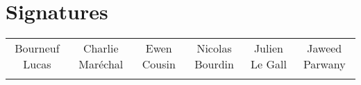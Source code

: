 
\newcommand{\titre}{Compte-rendu de séance}













\section{}
    	\paragraph*{}
    	\section{Signatures}
    	\begin{tabular*}{0.75\textwidth}{c | c | c | c | c | c}
    	    Bourneuf Lucas & Charlie Maréchal & Ewen Cousin & Nicolas Bourdin & Julien Le Gall & Jaweed Parwany\\
     	     & & & & &
    	\end{tabular*}

